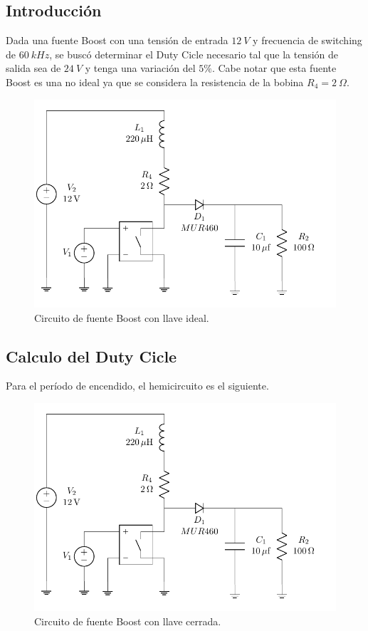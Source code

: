 



\subsection{Introducción}

Dada una fuente Boost con una tensión de entrada $12 \ V$ y frecuencia de switching de $60 \ kHz$, se buscó determinar el Duty Cicle necesario tal que la tensión de salida sea de $24 \ V$ y tenga una variación del $5\%$. Cabe notar que esta fuente Boost es una no ideal ya que se considera la resistencia de la bobina $R_4 = 2 \ \Omega$.

\begin{figure}[H]
	\centering
	\includegraphics[width=0.7\linewidth, page=1]{ImagenesEjercicio-2/CircuitsEj2}
	\caption{Circuito de fuente Boost con llave ideal.}
	\label{fig:ej2:circuito}
\end{figure}

\subsection{Calculo del Duty Cicle}

Para el período de encendido, el hemicircuito es el siguiente. 

\begin{figure}[H]
	\centering
	\includegraphics[width=0.8\linewidth, page=2]{ImagenesEjercicio-2/CircuitsEj2}
	\caption{Circuito de fuente Boost con llave cerrada.}
	\label{fig:ej2:off}
\end{figure}

